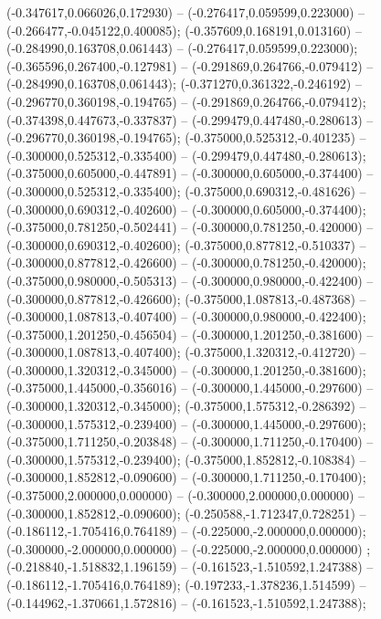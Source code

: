 (-0.347617,0.066026,0.172930) -- (-0.276417,0.059599,0.223000) -- (-0.266477,-0.045122,0.400085);
 (-0.357609,0.168191,0.013160) -- (-0.284990,0.163708,0.061443) -- (-0.276417,0.059599,0.223000);
 (-0.365596,0.267400,-0.127981) -- (-0.291869,0.264766,-0.079412) -- (-0.284990,0.163708,0.061443);
 (-0.371270,0.361322,-0.246192) -- (-0.296770,0.360198,-0.194765) -- (-0.291869,0.264766,-0.079412);
 (-0.374398,0.447673,-0.337837) -- (-0.299479,0.447480,-0.280613) -- (-0.296770,0.360198,-0.194765);
 (-0.375000,0.525312,-0.401235) -- (-0.300000,0.525312,-0.335400) -- (-0.299479,0.447480,-0.280613);
 (-0.375000,0.605000,-0.447891) -- (-0.300000,0.605000,-0.374400) -- (-0.300000,0.525312,-0.335400);
 (-0.375000,0.690312,-0.481626) -- (-0.300000,0.690312,-0.402600) -- (-0.300000,0.605000,-0.374400);
 (-0.375000,0.781250,-0.502441) -- (-0.300000,0.781250,-0.420000) -- (-0.300000,0.690312,-0.402600);
 (-0.375000,0.877812,-0.510337) -- (-0.300000,0.877812,-0.426600) -- (-0.300000,0.781250,-0.420000);
 (-0.375000,0.980000,-0.505313) -- (-0.300000,0.980000,-0.422400) -- (-0.300000,0.877812,-0.426600);
 (-0.375000,1.087813,-0.487368) -- (-0.300000,1.087813,-0.407400) -- (-0.300000,0.980000,-0.422400);
 (-0.375000,1.201250,-0.456504) -- (-0.300000,1.201250,-0.381600) -- (-0.300000,1.087813,-0.407400);
 (-0.375000,1.320312,-0.412720) -- (-0.300000,1.320312,-0.345000) -- (-0.300000,1.201250,-0.381600);
 (-0.375000,1.445000,-0.356016) -- (-0.300000,1.445000,-0.297600) -- (-0.300000,1.320312,-0.345000);
 (-0.375000,1.575312,-0.286392) -- (-0.300000,1.575312,-0.239400) -- (-0.300000,1.445000,-0.297600);
 (-0.375000,1.711250,-0.203848) -- (-0.300000,1.711250,-0.170400) -- (-0.300000,1.575312,-0.239400);
 (-0.375000,1.852812,-0.108384) -- (-0.300000,1.852812,-0.090600) -- (-0.300000,1.711250,-0.170400);
 (-0.375000,2.000000,0.000000) -- (-0.300000,2.000000,0.000000) -- (-0.300000,1.852812,-0.090600);
 (-0.250588,-1.712347,0.728251) -- (-0.186112,-1.705416,0.764189) -- (-0.225000,-2.000000,0.000000);
 (-0.300000,-2.000000,0.000000) -- (-0.225000,-2.000000,0.000000) ;
 (-0.218840,-1.518832,1.196159) -- (-0.161523,-1.510592,1.247388) -- (-0.186112,-1.705416,0.764189);
 (-0.197233,-1.378236,1.514599) -- (-0.144962,-1.370661,1.572816) -- (-0.161523,-1.510592,1.247388);
